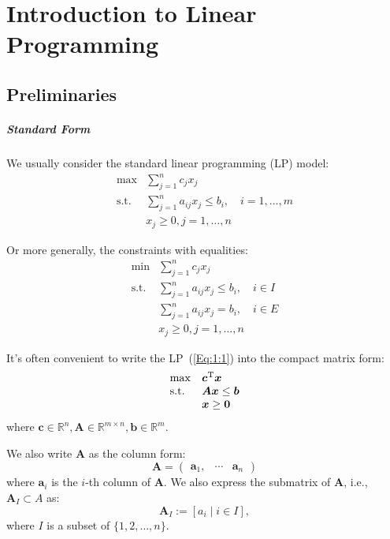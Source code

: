 \chapter{Introduction to Linear Programming}

\section{Preliminaries}
\paragraph{Standard Form}
We usually consider the standard linear programming (LP) model:
\begin{equation}\label{Eq:1:1}
\begin{array}{ll}
\max&\sum_{j=1}^nc_jx_j\\
\text{s.t.}&\sum_{j=1}^na_{ij}x_j\le b_i,\quad i=1,\dots,m\\
&x_j\ge 0, j=1,\dots,n
\end{array}
\end{equation}

Or more generally, the constraints with equalities:
\begin{equation*}
\begin{array}{ll}
\min&\sum_{j=1}^nc_jx_j\\
\text{s.t.}&\sum_{j=1}^na_{ij}x_j\le b_i,\quad i\in I\\
&\sum_{j=1}^na_{ij}x_j= b_i,\quad i\in E\\
&x_j\ge 0, j=1,\dots,n
\end{array}
\end{equation*}

It's often convenient to write the LP~(\ref{Eq:1:1}) into the compact matrix form:
\begin{equation}
\begin{array}{ll}
\max&\bm c^{\mathrm T}\bm x\\
\text{s.t.}&\bm{Ax}\le\bm b\\
&\bm x\ge\bm0
\end{array}
\end{equation}
where $\bm c\in\mathbb{R}^n,\bm A\in\mathbb{R}^{m\times n},\bm b\in\mathbb{R}^m$.

We also write $\bm A$ as the column form:
\[
\bm A=\begin{pmatrix}
\bm a_1,&\cdots&\bm a_n
\end{pmatrix}
\]
where $\bm a_i$ is the $i$-th column of $\bm A$. We also express the submatrix of $\bm A$, i.e., $\bm A_I\subset A$ as:
\[
\bm A_I:=[a_i\mid i\in I],
\]
where $I$ is a subset of $\{1,2,\dots,n\}$.

